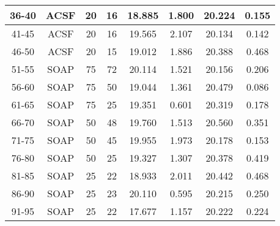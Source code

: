 \documentclass[12pt]{article}
\begin{document}
\begin{appendices}
\begin{table}[H]
\begin{tabular}{|c|c|c|c|c|c|c|c|}
		36-40	& ACSF	& 20	& 16	& 18.885	& 1.800	& 20.224	& 0.155	\\ \hline
		41-45	& ACSF	& 20	& 16	& 19.565	& 2.107	& 20.134	& 0.142	\\ \hline
		46-50	& ACSF	& 20	& 15	& 19.012	& 1.886	& 20.388	& 0.468	\\ \hline
		51-55	& SOAP	& 75	& 72	& 20.114	& 1.521	& 20.156	& 0.206	\\ \hline
		56-60	& SOAP	& 75	& 50	& 19.044	& 1.361	& 20.479	& 0.086	\\ \hline
		61-65	& SOAP	& 75	& 25	& 19.351	& 0.601	& 20.319	& 0.178	\\ \hline
		66-70	& SOAP	& 50	& 48	& 19.760	& 1.513	& 20.560	& 0.351	\\ \hline
		71-75	& SOAP	& 50	& 45	& 19.955	& 1.973	& 20.178	& 0.153	\\ \hline
		76-80	& SOAP	& 50	& 25	& 19.327	& 1.307	& 20.378	& 0.419	\\ \hline
		81-85	& SOAP	& 25	& 22	& 18.933	& 2.011	& 20.442	& 0.468	\\ \hline
		86-90	& SOAP	& 25	& 23	& 20.110	& 0.595	& 20.215	& 0.250	\\ \hline
		91-95	& SOAP	& 25	& 22	& 17.677	& 1.157	& 20.222	& 0.224	\\ \hline
	\end{tabular}
	\label{tab:app_gen_labels}
\end{table}



\end{appendices}
\end{document}
